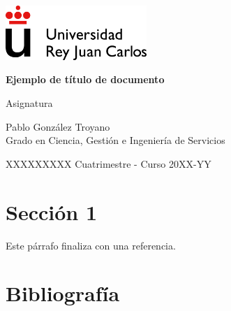 \documentclass[10pt, a4paper]{article}
\let \cite \parencite
\newcommand\asignatura{Asignatura}
\newcommand\DocumentTitle{Ejemplo de título de documento}
\newcommand\mesyanno{XXXXXXXXX Cuatrimestre - Curso 20XX-YY}
\newcommand\autor{Pablo González Troyano}
\newcommand\grado{Grado en Ciencia, Gestión e Ingeniería de Servicios}
\begin{document}
\begin{titlepage}
\includegraphics[width=0.4\textwidth]{URJC_logo.png}
    \begin{center}
        \vspace*{7cm}  
        \Huge
        \textbf{\DocumentTitle}
        
        \vspace{1cm}
        
        \huge{\asignatura}
        \vspace{1.5cm}
        \Large
        \vfill    
        \vspace{1cm}
        \Large
    \end{center}
    {\parindent0pt \autor \\ \grado }
    \begin{flushright}
        \mesyanno
    \end{flushright}
\end{titlepage}
\tableofcontents\newpage

\newpage

\section{Sección 1}
    \lipsum[1-25]

    Este párrafo finaliza con una referencia. \cite{rae1}

\newpage
\section{Bibliografía}
\printbibliography[heading=none]


\end{document}
